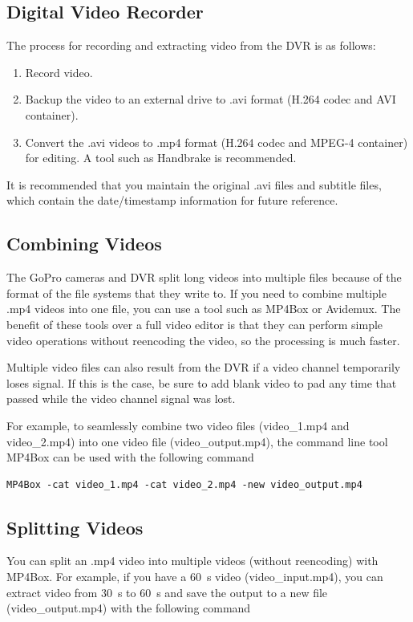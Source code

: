 \documentclass[11pt,oneside]{book}
\begin{document}
\subsection{Digital Video Recorder}

The process for recording and extracting video from the DVR is as follows:
\begin{enumerate}
\item Record video.
\item Backup the video to an external drive to .avi format (H.264 codec and AVI container).
\item Convert the .avi videos to .mp4 format (H.264 codec and MPEG-4 container) for editing. A tool such as Handbrake is recommended.
\end{enumerate}
It is recommended that you maintain the original .avi files and subtitle files, which contain the date/timestamp information for future reference.

\subsection{Combining Videos}

The GoPro cameras and DVR split long videos into multiple files because of the format of the file systems that they write to. If you need to combine multiple .mp4 videos into one file, you can use a tool such as MP4Box or Avidemux. The benefit of these tools over a full video editor is that they can perform simple video operations without reencoding the video, so the processing is much faster. 

Multiple video files can also result from the DVR if a video channel temporarily loses signal. If this is the case, be sure to add blank video to pad any time that passed while the video channel signal was lost.

For example, to seamlessly combine two video files (video\_1.mp4 and video\_2.mp4) into one video file (video\_output.mp4), the command line tool MP4Box can be used with the following command

\begin{verbatim}
MP4Box -cat video_1.mp4 -cat video_2.mp4 -new video_output.mp4
\end{verbatim}

\subsection{Splitting Videos}

You can split an .mp4 video into multiple videos (without reencoding) with MP4Box. For example, if you have a 60~s video (video\_input.mp4), you can extract video from 30~s to 60~s and save the output to a new file (video\_output.mp4) with the following command
\end{document}
